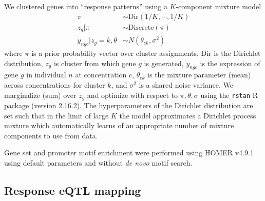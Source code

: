 \documentclass{article}
\begin{document}
We clustered genes into ``response patterns'' using a $K$-component mixture model 
\begin{align}
\pi &\sim \text{Dir}(1/K,\cdots,1/K) \nonumber \\ 
z_g | \pi &\sim \text{Discrete}(\pi) \nonumber \\
y_{ngc} | z_g=k, \theta &\sim N( \theta_{ck}, \sigma^2 )
\label{eq:mixture}
\end{align}
where $\pi$ is a prior probability vector over cluster assignments, Dir is the Dirichlet distribution, $z_g$ is cluster from which gene $g$ is generated, $y_{ngc}$ is the expression of gene $g$ in individual $n$ at concentration $c$, $\theta_{ck}$ is the mixture parameter (mean) across concentrations for cluster $k$, and $\sigma^2$ is a shared noise variance. 
We marginalize (sum) over $z_g$ and optimize with respect to $\pi, \theta, \sigma$ using the \texttt{rstan} R package\cite{carpenter2016stan} (version 2.16.2). 
The hyperparameters of the Dirichlet distribution are set such that in the limit of large $K$ the model approximates a Dirichlet process mixture \cite{maceachern1998estimating} which automatically learns of an appropriate number of mixture components to use from data. 

Gene set and promoter motif enrichment were performed using HOMER v4.9.1\cite{heinz2010simple} using default parameters and without \emph{de novo} motif search. 

\subsection*{Response eQTL mapping} 
\end{document}
